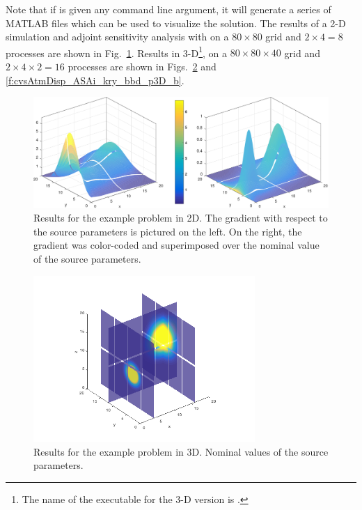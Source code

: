 Note that if  is given any command line argument,
it will generate a series of MATLAB files which can be used to visualize the solution.
The results of a 2-D simulation and adjoint sensitivity analysis with
 on a $80 \times 80$ grid and $2 \times 4 = 8$
processes are shown in Fig.~\ref{f:cvsAtmDisp_ASAi_kry_bbd_p2D}.
Results in 3-D\footnote{The name of the executable for the 3-D version is
.},  on a $80 \times 80 \times 40$ grid and 
$2 \times 4 \times 2= 16$ processes are shown in 
Figs.~\ref{f:cvsAtmDisp_ASAi_kry_bbd_p3D_a} and \ref{f:cvsAtmDisp_ASAi_kry_bbd_p3D_b}.
\begin{figure}
  {\centerline{\includegraphics[width=\textwidth]{cvsadjkryx_p2D}}}
  \caption{Results for the  example problem in 2D. 
    The gradient with respect to the source parameters is pictured on the left. 
    On the right, the gradient was color-coded and superimposed over the nominal value 
    of the source parameters.}
  \label{f:cvsAtmDisp_ASAi_kry_bbd_p2D}
\end{figure}
\begin{figure}
  {\centerline{\includegraphics[width=0.75\textwidth]{cvsadjkryx_p3Dcf.png}}}
  \caption{Results for the  example problem in 3D.
  Nominal values of the source parameters.}\label{f:cvsAtmDisp_ASAi_kry_bbd_p3D_a}
\end{figure}
